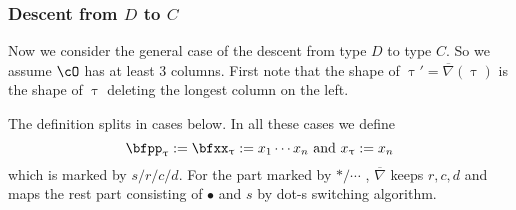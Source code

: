 \documentclass[12pt,a4paper]{amsart}
\def\eDD{\overline{\nabla}}
\numberwithin{equation}{section}
\theoremstyle{remark}
\begin{document}
\subsubsection{Descent from $D$ to $C$} Now we consider the general case of the
descent from type $D$ to type $C$. So we assume $\cO$ has at least 3 columns.
First note that the shape of $\uptau' = \eDD(\uptau)$ is the shape of $\uptau$ deleting the
longest column on the left.

The definition splits in cases below. In all these cases we define
\begin{equation}\label{eq:x.uptau}
 \bfpp_{\uptau}:= \bfxx_{\uptau} := x_{1}\cdots x_{n} \text{ and } x_{\uptau} := x_{n}
\end{equation}
which is marked by $s/r/c/d$.
For the part marked by $*/\cdots$ , $\eDD$ keeps $r,c,d$ and maps the rest part consisting of $\bullet$ and $s$ by dot-s switching algorithm.
\end{document}
